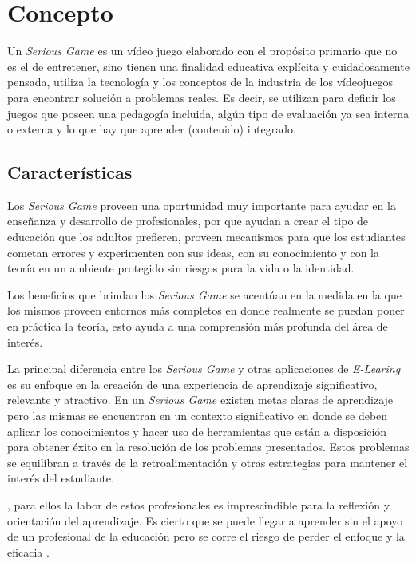 \section{Concepto}

Un \emph{Serious Game} es un vídeo juego elaborado con el propósito primario que
no es el de entretener\cite{sg:aoverview}, sino tienen una finalidad educativa
explícita y cuidadosamente pensada, utiliza la tecnología y los conceptos de la
industria de los vídeojuegos para encontrar solución a problemas reales. Es
decir, se utilizan para definir los juegos que poseen una pedagogía incluida,
algún tipo de evaluación ya sea interna o externa y lo que hay que aprender
(contenido) integrado\cite{damien:sg}.

\subsection{Características}

Los \emph{Serious Game} proveen una oportunidad muy importante para ayudar en la
enseñanza y desarrollo de profesionales, por que ayudan a crear el tipo de
educación que los adultos prefieren, proveen mecanismos para que los estudiantes
cometan errores y experimenten con sus ideas, con su conocimiento y con la
teoría en un ambiente protegido sin riesgos para la vida o la identidad. 

Los beneficios que brindan los \emph{Serious Game} se acentúan en la medida en
la que los mismos proveen entornos más completos en donde realmente se puedan
poner en práctica la teoría, esto ayuda a una comprensión más profunda del área
de interés.

La principal diferencia entre los \emph{Serious Game} y otras aplicaciones de
\emph{E-Learing} es su enfoque en la creación de una experiencia de aprendizaje
significativo, relevante y atractivo. En un \emph{Serious Game} existen metas
claras de aprendizaje pero las mismas se encuentran en un contexto significativo
en donde se deben aplicar los conocimientos y hacer uso de herramientas que
están a disposición para obtener éxito en la resolución de los problemas
presentados. Estos problemas se equilibran a través de la retroalimentación y
otras estrategias para mantener el interés del estudiante\cite{papertian:const}.

, para ellos la labor de estos
profesionales es imprescindible para la reflexión y orientación del aprendizaje.
Es cierto que se puede llegar a aprender sin el apoyo de un profesional de la
educación pero se corre el riesgo de perder el enfoque y la eficacia
\cite{elearning:seiousgames}. 

